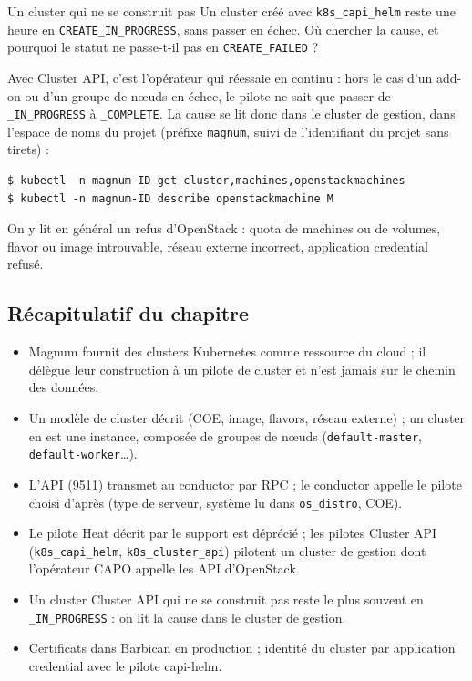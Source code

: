 \begin{exercice}{Un cluster qui ne se construit pas}\label{ex:ma-bloque}
Un cluster créé avec \texttt{k8s\_capi\_helm} reste une heure en \texttt{CREATE\_IN\_PROGRESS}, sans passer en échec. Où chercher
la cause, et pourquoi le statut ne passe-t-il pas en \texttt{CREATE\_FAILED} ?
\end{exercice}
\begin{correction}
Avec Cluster API, c'est l'opérateur qui réessaie en continu : hors le cas d'un add-on ou d'un groupe de nœuds en échec, le pilote
ne sait que passer de \texttt{\_IN\_PROGRESS} à \texttt{\_COMPLETE}. La cause se lit donc dans le cluster de gestion, dans l'espace de noms du projet (préfixe \texttt{magnum},
suivi de l'identifiant du projet sans tirets) :
\begin{lstlisting}[style=terminal]
$ kubectl -n magnum-ID get cluster,machines,openstackmachines
$ kubectl -n magnum-ID describe openstackmachine M
\end{lstlisting}
On y lit en général un refus d'OpenStack : quota de machines ou de volumes, flavor ou image introuvable, réseau externe
incorrect, application credential refusé.
\end{correction}

\subsection{Récapitulatif du chapitre}\label{sec:ma-recap}

\begin{aretenir}
\begin{itemize}
  \item Magnum fournit des clusters Kubernetes comme ressource du cloud ; il délègue leur construction à un pilote de cluster
        et n'est jamais sur le chemin des données.
  \item Un modèle de cluster décrit (COE, image, flavors, réseau externe) ; un cluster en est une instance, composée de
        groupes de nœuds (\texttt{default-master}, \texttt{default-worker}\dots).
  \item L'API (9511) transmet au conductor par RPC ; le conductor appelle le pilote choisi d'après (type de serveur, système
        lu dans \texttt{os\_distro}, COE).
  \item Le pilote Heat décrit par le support est déprécié ; les pilotes Cluster API (\texttt{k8s\_capi\_helm},
        \texttt{k8s\_cluster\_api}) pilotent un cluster de gestion dont l'opérateur CAPO appelle les API d'OpenStack.
  \item Un cluster Cluster API qui ne se construit pas reste le plus souvent en \texttt{\_IN\_PROGRESS} : on lit la cause dans
        le cluster de gestion.
  \item Certificats dans Barbican en production ; identité du cluster par application credential avec le pilote capi-helm.
\end{itemize}
\end{aretenir}

